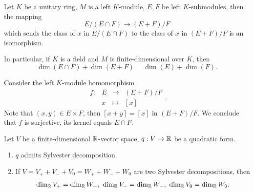 \begin{propositionenv}
    Let $K$ be a unitary ring, $M$ is a left $K$-module, $E,F$ be left $K$-submodules, then the mapping
    $$ E/(E\cap F )\rightarrow (E+F)/ F$$
    which sends the class of $x$ in $E/(E\cap F)$ to the class of $x$ in $(E+F)/F$ is an isomorphism.
    
    \quad In particular, if $K$ is a field and $M$ is finite-dimensional over $K$, then
    $$ \dim \left(E\cap F\right) + \dim \left(E+F\right) = \dim\left(E\right) + \dim \left(F\right).$$
\end{propositionenv}
\begin{proofenv}
    Consider the left $K$-module homomorphism
    $$ \begin{array}{rrcl}
        f: & E & \rightarrow & (E+F)/F\\
        & x & \mapsto & [x]
    \end{array}.$$
    Note that $(x,y)\in E\times F$, then $[x+y] = [x]$ in $(E+F)/F$.
    We conclude that $f$ is surjective, its kernel equals $E\cap F$.
\end{proofenv}
\begin{theoremenv}
    Let $V$ be a finite-dimensional $\mathbb{R}$-vector space, $q : V\rightarrow \mathbb{R}$ be a quadratic form.
    \begin{enumerate}
        \item $q$ admits Sylvester decomposition.
        \item If $V = V_+ + V_- +V_0 = W_+ +W_- + W_0$ are two Sylvester decompositions, then
        $$ \dim_{\mathbb{R}} V_+ = \dim_{\mathbb{R}} W_+,\ \dim_{\mathbb{R}} V_- = \dim_{\mathbb{R}} W_-,\ \dim_{\mathbb{R}} V_0 = \dim_{\mathbb{R}} W_0.$$
    \end{enumerate}
\end{theoremenv}
